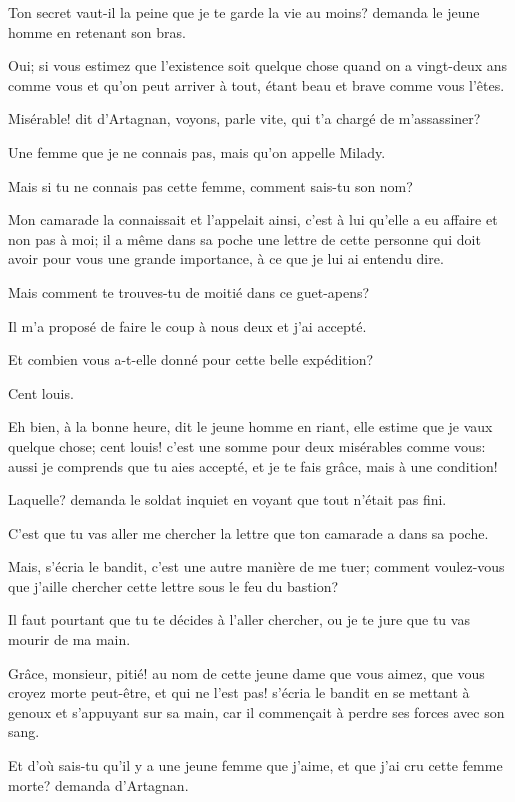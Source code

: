\speak  Ton secret vaut-il la peine que je te garde la vie au moins? demanda le jeune homme en retenant son bras. 

\speak  Oui; si vous estimez que l'existence soit quelque chose quand on a vingt-deux ans comme vous et qu'on peut arriver à tout, étant beau et brave comme vous l'êtes. 

\speak  Misérable! dit d'Artagnan, voyons, parle vite, qui t'a chargé de m'assassiner? 

\speak  Une femme que je ne connais pas, mais qu'on appelle Milady. 

\speak  Mais si tu ne connais pas cette femme, comment sais-tu son nom? 

\speak  Mon camarade la connaissait et l'appelait ainsi, c'est à lui qu'elle a eu affaire et non pas à moi; il a même dans sa poche une lettre de cette personne qui doit avoir pour vous une grande importance, à ce que je lui ai entendu dire. 

\speak  Mais comment te trouves-tu de moitié dans ce guet-apens? 

\speak  Il m'a proposé de faire le coup à nous deux et j'ai accepté. 

\speak  Et combien vous a-t-elle donné pour cette belle expédition? 

\speak  Cent louis. 

\speak  Eh bien, à la bonne heure, dit le jeune homme en riant, elle estime que je vaux quelque chose; cent louis! c'est une somme pour deux misérables comme vous: aussi je comprends que tu aies accepté, et je te fais grâce, mais à une condition! 

\speak  Laquelle? demanda le soldat inquiet en voyant que tout n'était pas fini. 

\speak  C'est que tu vas aller me chercher la lettre que ton camarade a dans sa poche. 

\speak  Mais, s'écria le bandit, c'est une autre manière de me tuer; comment voulez-vous que j'aille chercher cette lettre sous le feu du bastion? 

\speak  Il faut pourtant que tu te décides à l'aller chercher, ou je te jure que tu vas mourir de ma main. 

\speak  Grâce, monsieur, pitié! au nom de cette jeune dame que vous aimez, que vous croyez morte peut-être, et qui ne l'est pas! s'écria le bandit en se mettant à genoux et s'appuyant sur sa main, car il commençait à perdre ses forces avec son sang. 

\speak  Et d'où sais-tu qu'il y a une jeune femme que j'aime, et que j'ai cru cette femme morte? demanda d'Artagnan. 

